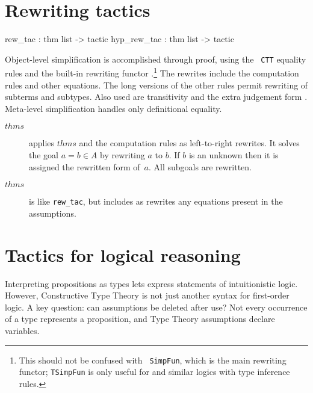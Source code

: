 \section{Rewriting tactics}
\begin{ttbox}
rew_tac     : thm list -> tactic
hyp_rew_tac : thm list -> tactic
\end{ttbox}
Object-level simplification is accomplished through proof, using the {\tt
CTT} equality rules and the built-in rewriting functor
.\footnote{This should not be confused with {\tt
SimpFun}, which is the main rewriting functor; {\tt TSimpFun} is only
useful for {\CTT} and similar logics with type inference rules.}
The rewrites include the computation rules and other equations.  The
long versions of the other rules permit rewriting of subterms and subtypes.
Also used are transitivity and the extra judgement form .
Meta-level simplification handles only definitional equality.
\begin{description}
\item[ $thms$]
applies $thms$ and the computation rules as left-to-right rewrites.  It
solves the goal $a=b\in A$ by rewriting $a$ to $b$.  If $b$ is an unknown
then it is assigned the rewritten form of~$a$.  All subgoals are rewritten.

\item[ $thms$]
is like {\tt rew_tac}, but includes as rewrites any equations present in
the assumptions.
\end{description}


\section{Tactics for logical reasoning}
Interpreting propositions as types lets {\CTT} express statements of
intuitionistic logic.  However, Constructive Type Theory is not just
another syntax for first-order logic. A key question: can assumptions be
deleted after use?  Not every occurrence of a type represents a
proposition, and Type Theory assumptions declare variables.  

